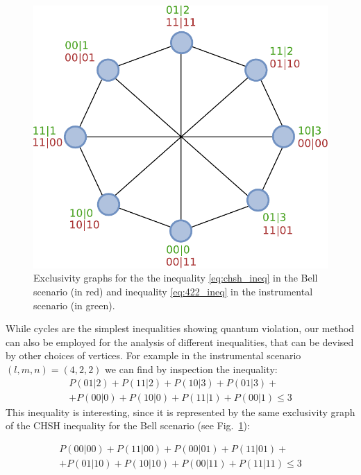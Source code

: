 \documentclass[letterpaper]{article}
\begin{document}
\begin{figure}[t]
    \centering
        \includegraphics[width=\columnwidth]{images/gclmp_graphs.pdf}
        \caption{Exclusivity graphs for the the inequality \eqref{eq:chsh_ineq} in the Bell
        scenario (in red) and inequality \eqref{eq:422_ineq} in the instrumental
    scenario (in green).}
        \label{fig:422_exgraph}
\end{figure}

While cycles are the simplest inequalities showing quantum violation, our method
can also be employed for the analysis of different inequalities, that can be 
devised by other choices of vertices. 
For example in the instrumental scenario $(l,m,n) = (4,2,2)$ we can find by inspection the inequality: 
\begin{multline}
    P(01\vert2) + P(11\vert2) + P(10\vert3) + P(01\vert3) + \\
     + P(00\vert0) + P(10\vert0) + P(11\vert1) + P(00\vert1) \le 3
    \label{eq:422_ineq}
\end{multline}
This inequality is interesting, since it is represented by the same exclusivity graph of the CHSH inequality \cite{CHSH} for the Bell scenario (see Fig.~\ref{fig:422_exgraph}): 

\begin{multline}
 P(00\vert 00) + P(11 \vert 00) + P(00\vert 01) + P(11 \vert 01) + \\
 +P(01 \vert 10) + P(10 \vert 10) + P(00 \vert 11) + P(11 \vert 11) \leq 3
\label{eq:chsh_ineq}
\end{multline}
\end{document}
